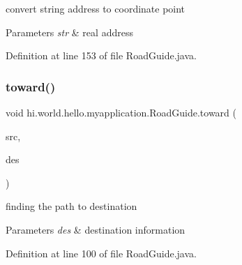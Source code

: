convert string address to coordinate point 


\begin{DoxyParams}{Parameters}
{\em str} & real address \\
\hline
\end{DoxyParams}


Definition at line 153 of file Road\+Guide.\+java.


\begin{DoxyCode}{0}

\end{DoxyCode}
\mbox{\label{classhi_1_1world_1_1hello_1_1myapplication_1_1_road_guide_af87d3224240ef90fcb995287620684d7}} 
\subsubsection{\texorpdfstring{toward()}{toward()}}
{\footnotesize\ttfamily void hi.\+world.\+hello.\+myapplication.\+Road\+Guide.\+toward (\begin{DoxyParamCaption}\item[{T\+Map\+Point}]{src,  }\item[{T\+Map\+Point}]{des }\end{DoxyParamCaption})}



finding the path to destination 


\begin{DoxyParams}{Parameters}
{\em des} & destination information \\
\hline
\end{DoxyParams}


Definition at line 100 of file Road\+Guide.\+java.


